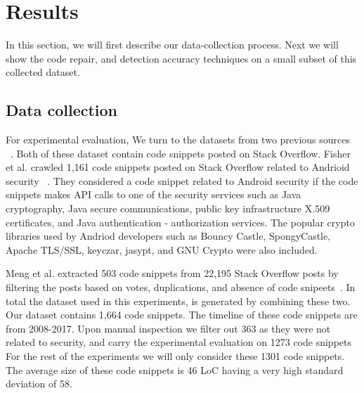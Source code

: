 \section{Results}
\label{sec:results}
In this section, we will first describe our data-collection process. Next we will show the code repair, 
and detection accuracy techniques on a small subset of this collected dataset.   

\subsection{Data collection} 
  For experimental evaluation, We turn to the datasets from two previous sources ~\cite{meng2018secure,fischer2017stack}. 
  Both of these dataset contain code snippets posted on Stack Overflow. 
  Fisher et al. crawled 1,161 code snippets posted on Stack Overflow related to Andrioid security ~\cite{fischer2017stack}. 
  They considered a code snippet related to Android security if the code snippets makes API calls to
  one of the security services such as Java cryptography, Java secure communications, public key infrastructure X.509 certificates, 
  and Java authentication - authorization services. The popular crypto libraries used by Andriod developers such as Bouncy Castle, 
  SpongyCastle, Apache TLS/SSL, keyczar, jasypt, and GNU Crypto were also included. 
  
  Meng et al.  extracted 503 code snippets from 22,195 Stack Overflow posts by filtering the posts based on votes, duplications, 
  and absence of code snipeets~\cite{meng2018secure}. In total the dataset used in this experiments,  is generated by combining these two. 
  Our dataset contains 1,664 code snippets. The timeline of these code snippets are from 2008-2017.
  Upon manual inspection we filter out 363 as they were not related to security, and carry the experimental evaluation on 1273 code snippets 
  For the rest of the experiments we will only consider these 1301 code snippets.
    The average size of these %
  code snippets is 46 LoC having a very high standard deviation of 58. 


  

